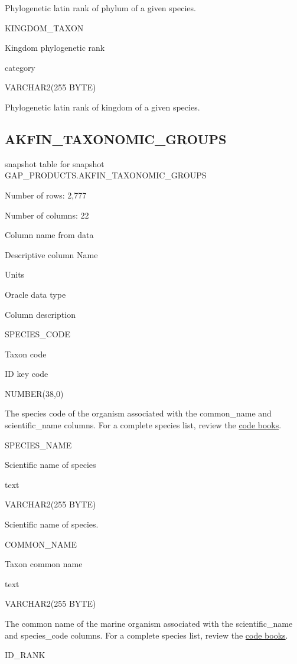 \documentclass[
  letterpaper,
  oneside,
  open=any]{scrbook}
\begin{document}
Phylogenetic latin rank of phylum of a given species.

KINGDOM\_TAXON

Kingdom phylogenetic rank

category

VARCHAR2(255 BYTE)

Phylogenetic latin rank of kingdom of a given species.

\subsection{AKFIN\_TAXONOMIC\_GROUPS}\label{akfin_taxonomic_groups}

snapshot table for snapshot GAP\_PRODUCTS.AKFIN\_TAXONOMIC\_GROUPS

Number of rows: 2,777

Number of columns: 22

Column name from data

Descriptive column Name

Units

Oracle data type

Column description

SPECIES\_CODE

Taxon code

ID key code

NUMBER(38,0)

The species code of the organism associated with the common\_name and
scientific\_name columns. For a complete species list, review the
\href{https://www.fisheries.noaa.gov/resource/document/groundfish-survey-species-code-manual-and-data-codes-manual}{code
books}.

SPECIES\_NAME

Scientific name of species

text

VARCHAR2(255 BYTE)

Scientific name of species.

COMMON\_NAME

Taxon common name

text

VARCHAR2(255 BYTE)

The common name of the marine organism associated with the
scientific\_name and species\_code columns. For a complete species list,
review the
\href{https://www.fisheries.noaa.gov/resource/document/groundfish-survey-species-code-manual-and-data-codes-manual}{code
books}.

ID\_RANK
\end{document}
